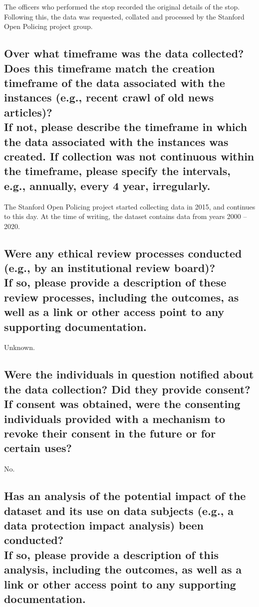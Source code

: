 \documentclass[letterpaper, 10 pt, conference]{ieeeconf}  %
\newcommand{\subtitle}[1]{{\\ \small \normalfont \color{purple} #1}}
\begin{document}
The officers who performed the stop recorded the original details of the stop. Following this, the data was requested, collated and processed by the Stanford Open Policing project group.

\subsection{Over what timeframe was the data collected? Does this timeframe match the creation timeframe of the data associated with the instances (e.g., recent crawl of old news articles)? \subtitle{If not, please describe the timeframe in which the data associated with the instances was created. If collection was not continuous within the timeframe, please specify the intervals, e.g., annually, every 4 year, irregularly.}}

The Stanford Open Policing project started collecting data in 2015, and continues to this day. At the time of writing, the dataset contains data from years 2000 -- 2020.

\subsection{Were any ethical review processes conducted (e.g., by an institutional review board)? \subtitle{If so, please provide a description of these review processes, including the outcomes, as well as a link or other access point to any supporting documentation.}}

Unknown.

\subsection{Were the individuals in question notified about the data collection? Did they provide consent? \subtitle{If consent was obtained, were the consenting individuals provided with a mechanism to revoke their consent in the future or for certain uses?}}

No.

\subsection{Has an analysis of the potential impact of the dataset and its use on data subjects (e.g., a data protection impact analysis) been conducted? \subtitle{If so, please provide a description of this analysis, including the outcomes, as well as a link or other access point to any supporting documentation.}}
\end{document}
